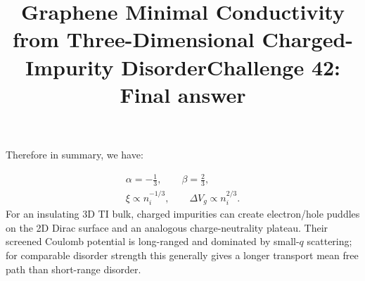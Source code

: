 \documentclass[11pt]{article}
\title{\vspace{-1.2cm}Graphene Minimal Conductivity from Three-Dimensional Charged-Impurity Disorder}
\author{}
\date{}
\title{Challenge 42: Final answer}
\author{}
\begin{document}
\maketitle
Therefore in summary, we have:

\begin{equation}
\boxed{
\begin{gathered}
\alpha=-\frac13,\qquad \beta=\frac23,\\[2pt]
\xi\propto n_i^{-1/3},\qquad
\Delta V_g\propto n_i^{2/3}.
\end{gathered}}
\end{equation}
For an insulating 3D TI bulk, charged impurities can create electron/hole puddles on the 2D Dirac surface and an analogous charge-neutrality plateau. Their screened Coulomb potential is long-ranged and dominated by small-$q$ scattering; for comparable disorder strength this generally gives a longer transport mean free path than short-range disorder.
\end{document}
